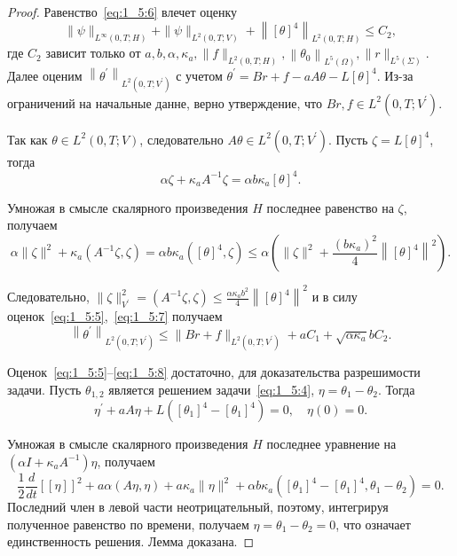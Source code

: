 \begin{proof}
    Равенство~\eqref{eq:1_5:6} влечет оценку
    \begin{equation}
        \label{eq:1_5:7}
        \|\psi\|_{L^{\infty}(0, T ; H)}+\|\psi\|_{L^{2}(0, T ; V)}
        +\left\|[\theta]^{4}\right\|_{L^{2}(0, T ; H)} \leq C_{2},
    \end{equation}
    где $C_2$ зависит только от
    $a, b, \alpha, \kappa_{a},\|f\|_{L^{2}(0, T ; H)},
    \left\|\theta_{0}\right\|_{L^{5}(\Omega)},\|r\|_{L^{5}(\Sigma)}$.
    Далее оценим $\left\|\theta^{\prime}\right\|_{L^{2}\left(0, T ; V^{\prime}\right)}$
    с учетом $\theta^{\prime}=B r+f-a A \theta-L[\theta]^{4}$.
    Из-за ограничений на начальные данне, верно утверждение,
    что $B r, f \in L^{2}\left(0, T ; V^{\prime}\right)$.

    Так как $\theta \in L^{2}(0, T ; V)$,
    следовательно $A \theta \in L^{2}\left(0, T ; V^{\prime}\right)$.
    Пусть $\zeta=L[\theta]^{4}$, тогда
    \[
        \alpha \zeta+\kappa_{a} A^{-1} \zeta=\alpha b \kappa_{a}[\theta]^{4}.
    \]

    Умножая в смысле скалярного произведения $H$ последнее равенство на $\zeta$, получаем
    \[
        \alpha\|\zeta\|^{2}+\kappa_{a}\left(A^{-1} \zeta, \zeta\right)
        =\alpha b \kappa_{a}\left([\theta]^{4}, \zeta\right)
        \leq \alpha\left(\|\zeta\|^{2}
        +\frac{\left(b \kappa_{a}\right)^{2}}{4}\left\|[\theta]^{4}\right\|^{2}\right).
    \]

    Следовательно, $\|\zeta\|_{V^{\prime}}^{2}=\left(A^{-1} \zeta,
    \zeta\right) \leq \frac{\alpha \kappa_{a} b^{2}}{4}\left\|[\theta]^{4}\right\|^{2}$
    и в силу оценок~\eqref{eq:1_5:5},~\eqref{eq:1_5:7} получаем
    \begin{equation}
        \label{eq:1_5:8}
        \left\|\theta^{\prime}\right\|_{L^{2}\left(0, T ; V^{\prime}\right)}
        \leq\|B r+f\|_{L^{2}\left(0, T ; V^{\prime}\right)}
        +a C_{1}+\sqrt{\alpha \kappa_{a}} b C_{2}.
    \end{equation}


    Оценок~\eqref{eq:1_5:5}--\eqref{eq:1_5:8} достаточно, для доказательства разрешимости задачи.
    Пусть $\theta_{1,2}$ является решением задачи~\eqref{eq:1_5:4}, $\eta=\theta_{1}-\theta_{2}$.
    Тогда
    \[
        \eta^{\prime}+a A \eta+L\left(\left[\theta_{1}\right]^{4}-
        \left[\theta_{1}\right]^{4}\right)=0, \quad \eta(0)=0.
    \]

    Умножая в смысле скалярного произведения $H$
    последнее уравнение на $\left(\alpha I+\kappa_{a} A^{-1}\right) \eta$,
    получаем
    \[
        \frac{1}{2} \frac{d}{d t}[[\eta]]^{2}
        +a \alpha(A \eta, \eta)
        +a \kappa_{a}\|\eta\|^{2}
        +\alpha b \kappa_{a}\left(\left[\theta_{1}\right]^{4}
        -\left[\theta_{1}\right]^{4}, \theta_{1}-\theta_{2}\right)=0.
    \]
    Последний член в левой части неотрицательный,
    поэтому, интегрируя полученное равенство по времени,
    получаем $\eta=\theta_{1}-\theta_{2}=0$, что означает единственность решения.
    Лемма доказана.

\end{proof}
